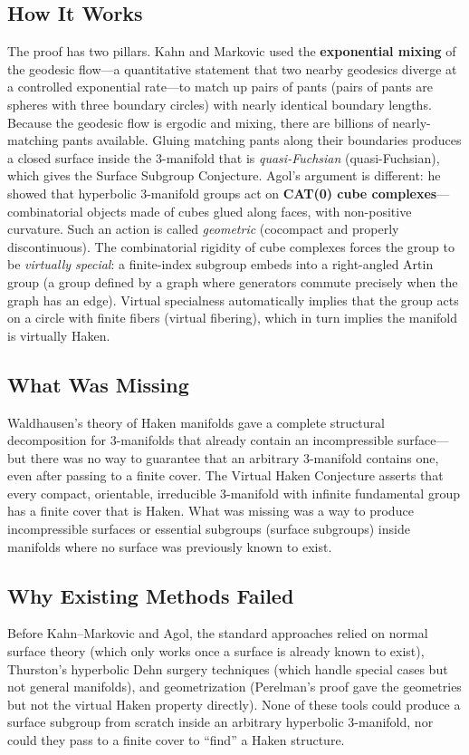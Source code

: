 \subsection{How It Works}
The proof has two pillars. Kahn and Markovic used the \textbf{exponential mixing} of the geodesic flow---a quantitative statement that two nearby geodesics diverge at a controlled exponential rate---to match up pairs of pants (pairs of pants are spheres with three boundary circles) with nearly identical boundary lengths. Because the geodesic flow is ergodic and mixing, there are billions of nearly-matching pants available. Gluing matching pants along their boundaries produces a closed surface inside the 3-manifold that is \emph{quasi-Fuchsian} (quasi-Fuchsian), which gives the Surface Subgroup Conjecture. Agol's argument is different: he showed that hyperbolic 3-manifold groups act on \textbf{CAT(0) cube complexes}---combinatorial objects made of cubes glued along faces, with non-positive curvature. Such an action is called \emph{geometric} (cocompact and properly discontinuous). The combinatorial rigidity of cube complexes forces the group to be \emph{virtually special}: a finite-index subgroup embeds into a right-angled Artin group (a group defined by a graph where generators commute precisely when the graph has an edge). Virtual specialness automatically implies that the group acts on a circle with finite fibers (virtual fibering), which in turn implies the manifold is virtually Haken.

\subsection{What Was Missing}
Waldhausen's theory of Haken manifolds gave a complete structural decomposition for 3-manifolds that already contain an incompressible surface---but there was no way to guarantee that an arbitrary 3-manifold contains one, even after passing to a finite cover. The Virtual Haken Conjecture asserts that every compact, orientable, irreducible 3-manifold with infinite fundamental group has a finite cover that is Haken. What was missing was a way to produce incompressible surfaces or essential subgroups (surface subgroups) inside manifolds where no surface was previously known to exist.

\subsection{Why Existing Methods Failed}
Before Kahn--Markovic and Agol, the standard approaches relied on normal surface theory (which only works once a surface is already known to exist), Thurston's hyperbolic Dehn surgery techniques (which handle special cases but not general manifolds), and geometrization (Perelman's proof gave the geometries but not the virtual Haken property directly). None of these tools could produce a surface subgroup from scratch inside an arbitrary hyperbolic 3-manifold, nor could they pass to a finite cover to ``find'' a Haken structure.

